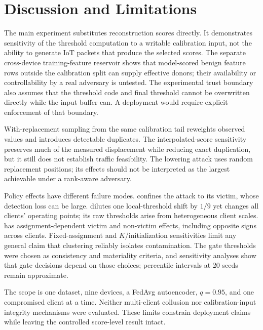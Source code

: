 \section{Discussion and Limitations}
\label{sec:discussion}

The main experiment substitutes reconstruction scores directly. It demonstrates sensitivity of the threshold computation to a writable calibration input, not the ability to generate IoT packets that produce the selected scores. The separate cross-device training-feature reservoir shows that model-scored benign feature rows outside the calibration split can supply effective donors; their availability or controllability by a real adversary is untested. The experimental trust boundary also assumes that the threshold code and final threshold cannot be overwritten directly while the input buffer can. A deployment would require explicit enforcement of that boundary.

With-replacement sampling from the same calibration tail reweights observed values and introduces detectable duplicates. The interpolated-score sensitivity preserves much of the measured displacement while reducing exact duplication, but it still does not establish traffic feasibility. The lowering attack uses random replacement positions; its effects should not be interpreted as the largest achievable under a rank-aware adversary.

Policy effects have different failure modes. \LOCAL confines the attack to its victim, whose detection loss can be large. \GLOBAL dilutes one local-threshold shift by $1/9$ yet changes all clients' operating points; its raw thresholds arise from heterogeneous client scales. \CLUSTER has assignment-dependent victim and non-victim effects, including opposite signs across clients. Fixed-assignment and $K$/initialization sensitivities limit any general claim that clustering reliably isolates contamination. The gate thresholds were chosen as consistency and materiality criteria, and sensitivity analyses show that gate decisions depend on those choices; percentile intervals at 20 seeds remain approximate.

The scope is one dataset, nine devices, a FedAvg autoencoder, $q{=}0.95$, and one compromised client at a time. Neither multi-client collusion nor calibration-input integrity mechanisms were evaluated. These limits constrain deployment claims while leaving the controlled score-level result intact.
